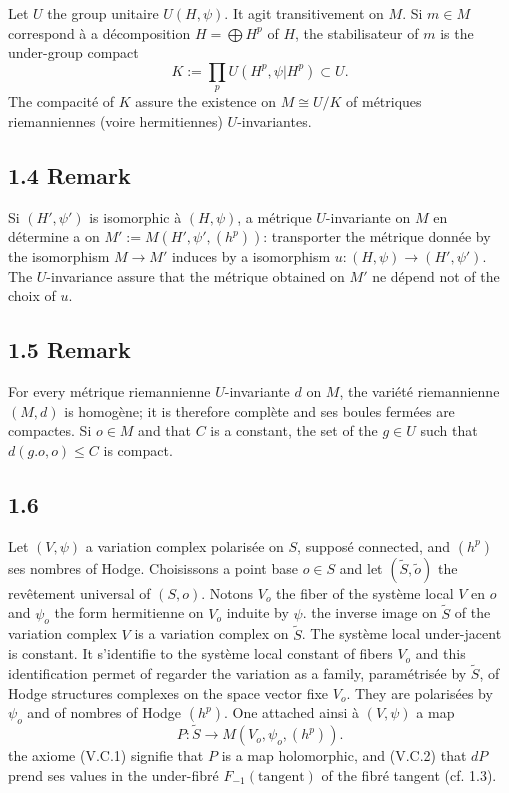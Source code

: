 \documentclass[12pt,a4paper]{article}
\theoremstyle{plain}
\theoremstyle{definition}
\begin{document}
{Let $U$ the group unitaire $U(H, \psi)$. It agit transitivement on $M$. Si $m \in M$ correspond \`{a} a d\'{e}composition $H = \bigoplus H^{p}$ of $H$, the stabilisateur of $m$ is the under-group compact
\[
K := \prod_{p} U(H^{p}, \psi|H^{p}) \subset U.
\]
The compacit\'{e} of $K$ assure the existence on $M \cong U/K$ of m\'{e}triques riemanniennes (voire hermitiennes) $U$-invariantes.

\subsection*{1.4 Remark}
Si $(H', \psi')$ is isomorphic \`{a} $(H, \psi)$, a m\'{e}trique $U$-invariante on $M$ en d\'{e}termine a on $M' := M(H', \psi', (h^{p}))$: transporter the m\'{e}trique donn\'{e}e by the isomorphism $M \to M'$ induces by a isomorphism $u : (H, \psi) \to (H', \psi')$. The $U$-invariance assure that the m\'{e}trique obtained on $M'$ ne d\'{e}pend not of the choix of $u$.

\subsection*{1.5 Remark}
For every m\'{e}trique riemannienne $U$-invariante $d$ on $M$, the vari\'{e}t\'{e} riemannienne $(M, d)$ is homog\`{e}ne; it is therefore compl\`{e}te and ses boules ferm\'{e}es are compactes. Si $o \in M$ and that $C$ is a constant, the set of the $g \in U$ such that $d(g.o, o) \leq C$ is compact.

\subsection*{1.6}
Let $(V, \psi)$ a variation complex polaris\'{e}e on $S$, suppos\'{e} connected, and $(h^{p})$ ses nombres of Hodge. Choisissons a point base $o \in S$ and let $(\widetilde{S}, \tilde{o})$ the rev\^{e}tement universal of $(S,o)$. Notons $V_{o}$ the fiber of the syst\`{e}me local $V$ en $o$ and $\psi_{o}$ the form hermitienne on $V_{o}$ induite by $\psi$. the inverse image on $\widetilde{S}$ of the variation complex $V$ is a variation complex on $\widetilde{S}$. The syst\`{e}me local under-jacent is constant. It s'identifie to the syst\`{e}me local constant of fibers $V_{o}$ and this identification permet of regarder the variation as a family, param\'{e}tris\'{e}e by $\widetilde{S}$, of Hodge structures complexes on the space vector fixe $V_{o}$. They are polaris\'{e}es by $\psi_{o}$ and of nombres of Hodge $(h^{p})$. One attached ainsi \`{a} $(V, \psi)$ a map
\[
P : \widetilde{S} \to M(V_{o}, \psi_{o}, (h^{p})).
\]
the axiome (V.C.1) signifie that $P$ is a map holomorphic, and (V.C.2) that $dP$ prend ses values in the under-fibr\'{e} $F_{-1}(\text{tangent})$ of the fibr\'{e} tangent (cf. 1.3).

}
\end{document}
